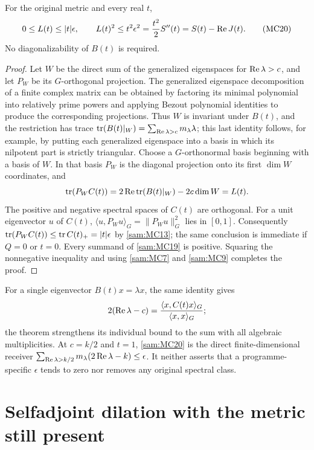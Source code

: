 \documentclass[11pt]{article}
\begin{document}
\begin{samtheorem}
For the original metric and every real \(t\),
\begin{equation}
 0\le L(t)\le |t|\epsilon,\qquad
 L(t)^2\le t^2\epsilon^2
      =\frac{t^2}{2}S''(t)
      =S(t)-\operatorname{Re} J(t).
 \tag{MC20}\label{sam:MC20}
\end{equation}
No diagonalizability of \(B(t)\) is required.
\end{samtheorem}
\begin{proof}
Let \(W\) be the direct sum of the generalized eigenspaces for
\(\operatorname{Re}\lambda>c\), and let \(P_W\) be its \(G\)-orthogonal projection.
The generalized eigenspace decomposition of a finite complex matrix
can be obtained by factoring its minimal polynomial into relatively
prime powers and applying Bezout polynomial identities to produce the
corresponding projections. Thus \(W\) is invariant under \(B(t)\),
and the restriction has trace
\(\operatorname{tr}(B(t)|_W)=\sum_{\operatorname{Re}\lambda>c}m_\lambda\lambda\);
this last identity follows, for example, by putting each generalized
eigenspace into a basis in which its nilpotent part is strictly triangular.
Choose a \(G\)-orthonormal basis beginning with a basis of \(W\).
In that basis \(P_W\) is the diagonal projection onto its first
\(\dim W\) coordinates, and
\[
 \operatorname{tr}(P_W C(t))
   =2\operatorname{Re}\operatorname{tr}(B(t)|_W)-2c\dim W=L(t).
\]
The positive and negative spectral spaces of \(C(t)\) are orthogonal.
For a unit eigenvector \(u\) of \(C(t)\),
\(\langle u,P_Wu\rangle_G=\|P_Wu\|_G^2\) lies in \([0,1]\).
Consequently
\(\operatorname{tr}(P_W C(t))\le\operatorname{tr} C(t)_+=|t|\epsilon\) by \eqref{sam:MC13};
the same conclusion is immediate if \(Q=0\) or \(t=0\).
Every summand of \eqref{sam:MC19} is positive. Squaring the nonnegative
inequality and using \eqref{sam:MC7} and \eqref{sam:MC9} completes the proof.
\end{proof}

For a single eigenvector \(B(t)x=\lambda x\), the same identity gives
\[
 2(\operatorname{Re}\lambda-c)=
 \frac{\langle x,C(t)x\rangle_G}{\langle x,x\rangle_G};
\]
the theorem strengthens its individual bound to the sum with all
algebraic multiplicities. At \(c=k/2\) and \(t=1\),
\eqref{sam:MC20} is the direct finite-dimensional receiver
\(\sum_{\operatorname{Re}\lambda>k/2}m_\lambda(2\operatorname{Re}\lambda-k)\le\epsilon\).
It neither asserts that a programme-specific \(\epsilon\) tends to zero
nor removes any original spectral class.

\section{Selfadjoint dilation with the metric still present}
\end{document}
